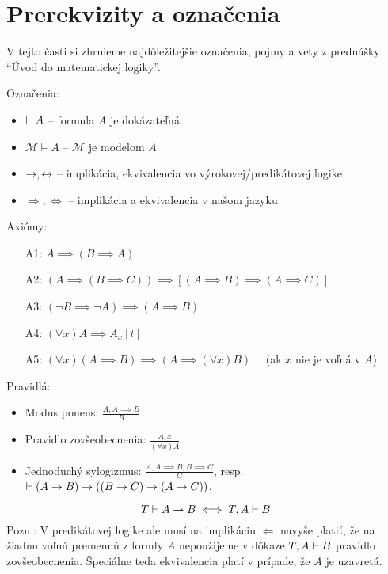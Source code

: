 \section{Prerekvizity a označenia}

V tejto časti si zhrnieme najdôležitejšie označenia, pojmy a vety z
prednášky ``Úvod do matematickej logiky''.

\noindent Označenia:
\begin{itemize}
    \item $\vdash A$ -- formula $A$ je dokázateľná
    \item $\mathcal{M} \models A$ -- $\mathcal{M}$ je modelom $A$
    \item $\rightarrow, \leftrightarrow$ -- implikácia, ekvivalencia vo
    výrokovej/predikátovej logike
    \item $\Rightarrow, \Leftrightarrow$ -- implikácia a ekvivalencia v
    našom jazyku
\end{itemize}

\noindent Axiómy:
\begin{itemize}
    \item[A1:] $A \implies (B \implies A)$
    \item[A2:] $(A \implies (B \implies C)) \implies 
                [(A \implies B) \implies (A \implies C)]$
    \item[A3:] $(\neg B \implies \neg A) \implies (A \implies B)$
    \smallskip
    \item[A4:] $(\forall x) A \implies A_x[t]$
    \item[A5:] $(\forall x) (A \implies B) \implies (A \implies
    (\forall x) B)\quad$ (ak $x$ nie je voľná v $A$)
\end{itemize}

\noindent Pravidlá:
\begin{itemize}
    \item Modus ponens: $\displaystyle \frac{A,A\implies B}{B}$
    \item Pravidlo zovšeobecnenia:
            $\displaystyle \frac{A,x}{(\forall x)A}$
    \item Jednoduchý sylogizmus:
            $\displaystyle \frac{A, A\implies B, B\implies C}{C}$, resp.
            $\vdash (A \rightarrow B) \rightarrow ((B \rightarrow C) 
                \rightarrow (A \rightarrow C))$.
\end{itemize}

\begin{veta}[O dedukcii]
    \begin{equation*}
        T \vdash A \rightarrow B \iff T,A \vdash B
    \end{equation*}
    Pozn.: V predikátovej logike ale musí na implikáciu $\Leftarrow$ 
    navyše platiť, že na žiadnu voľnú premennú z formly $A$
    nepoužijeme v dôkaze $T,A \vdash B$ pravidlo zovšeobecnenia.
    Špeciálne teda ekvivalencia platí v prípade, že $A$ je uzavretá.
\end{veta}


